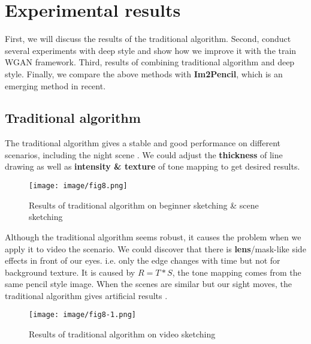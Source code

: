 \section{Experimental results}
First, we will discuss the results of the traditional algorithm. Second, conduct several experiments with deep style and show how we improve it with the train WGAN framework. Third, results of combining traditional algorithm and deep style. Finally, we compare the above methods with \textbf{Im2Pencil}, which is an emerging method in recent.

\subsection{Traditional algorithm}
The traditional algorithm gives a stable and good performance on different scenarios, including the night scene . We could adjust the \textbf{thickness} of line drawing as well as \textbf{intensity \& texture} of tone mapping to get desired results.
\begin{figure}
  \centering
  \texttt{[image: image/fig8.png]}
  \caption{Results of traditional algorithm on beginner sketching \& scene sketching}
  \label{fig8}
\end{figure}

Although the traditional algorithm seems robust, it causes the problem when we apply it to video the scenario. We could discover that there is \textbf{lens}/mask-like side effects in front of our eyes. i.e. only the edge changes with time but not for background texture. It is caused by \(R = T \ast S\), the tone mapping comes from the same pencil style image. When the scenes are similar but our sight moves, the traditional algorithm gives artificial results .
\begin{figure}
  \centering
  \texttt{[image: image/fig8-1.png]}
  \caption{Results of traditional algorithm on video sketching}
  \label{fig8-1}
\end{figure}

